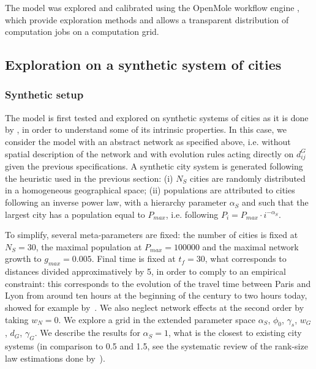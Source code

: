 \documentclass[11pt]{article}
\begin{document}
The model was explored and calibrated using the OpenMole workflow engine \citep{reuillon2013openmole}, which provide exploration methods and allows a transparent distribution of computation jobs on a computation grid.



\subsection{Exploration on a synthetic system of cities}

\subsubsection{Synthetic setup}

The model is first tested and explored on synthetic systems of cities as it is done by \cite{favaro2011gibrat}, in order to understand some of its intrinsic properties. In this case, we consider the model with an abstract network as specified above, i.e. without spatial description of the network and with evolution rules acting directly on $d^G_{ij}$ given the previous specifications. A synthetic city system is generated following the heuristic used in the previous section: (i) $N_S$ cities are randomly distributed in a homogeneous geographical space; (ii) populations are attributed to cities following an inverse power law, with a hierarchy parameter $\alpha_S$ and such that the largest city has a population equal to $P_{max}$, i.e. following $P_i = P_{max} \cdot i^{-\alpha_S}$.


To simplify, several meta-parameters are fixed: the number of cities is fixed at $N_S = 30$, the maximal population at $P_{max} = 100000$ and the maximal network growth to $g_{max} = 0.005$. Final time is fixed at $t_f = 30$, what corresponds to distances divided approximatively by 5, in order to comply to an empirical constraint: this corresponds to the evolution of the travel time between Paris and Lyon from around ten hours at the beginning of the century to two hours today, showed for example by~\cite{thevenin2013mapping}. We also neglect network effects at the second order by taking $w_N = 0$. We explore a grid in the extended parameter space $\alpha_S$, $\phi_0$, $\gamma_s$, $w_G$, $d_G$, $\gamma_G$. We describe the results for $\alpha_S = 1$, what is the closest to existing city systems (in comparison to 0.5 and 1.5, see the systematic review of the rank-size law estimations done by~\cite{10.1371/journal.pone.0183919}).
\end{document}

